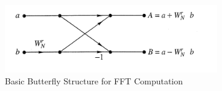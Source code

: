 \begin{figure}[H]
\centering
\includegraphics[scale=0.75]{figures/butterfly.png}
\caption{Basic Butterfly Structure for FFT Computation}
\label{fig:butterfly}
\end{figure}
